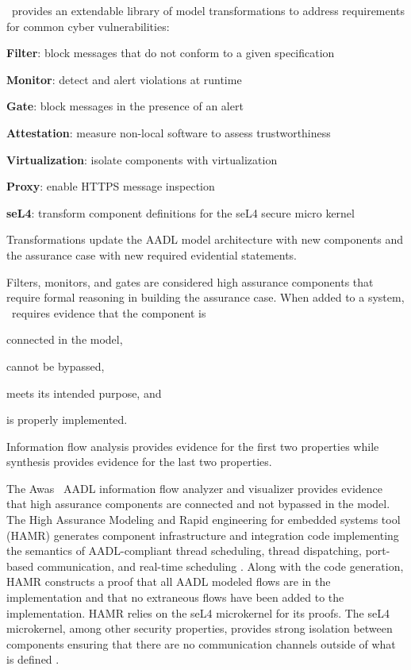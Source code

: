 \brfcs\ provides an extendable library of model transformations to address requirements for common cyber vulnerabilities:
\begin{compactitem}
	\item \textbf{Filter}: block messages that do not conform to a given specification
	\item \textbf{Monitor}: detect and alert violations at runtime
	\item \textbf{Gate}: block messages in the presence of an alert
	\item \textbf{Attestation}: measure non-local software to assess trustworthiness
	\item \textbf{Virtualization}: isolate components with virtualization
	\item \textbf{Proxy}: enable HTTPS message inspection 
	\item \textbf{seL4}: transform component definitions for the seL4 secure micro kernel
\end{compactitem}
Transformations update the AADL model architecture with new components and the assurance case with new required evidential statements.

Filters, monitors, and gates are considered high assurance components that require formal reasoning in building the assurance case.
When added to a system, \brfcs\ requires evidence that the component is 
\begin{compactenum}
	\item connected in the model, 
	\item cannot be bypassed, 
	\item meets its intended purpose, and
	\item is properly implemented.
\end{compactenum}
Information flow analysis provides evidence for the first two properties while synthesis provides evidence for the last two properties.

The Awas~\cite{awas} AADL information flow analyzer and visualizer provides evidence that high assurance components are connected and not bypassed in the model.
The High Assurance Modeling and Rapid engineering for embedded systems tool (HAMR) generates component infrastructure and integration code implementing the semantics of AADL-compliant thread scheduling, thread dispatching, port-based communication, and real-time scheduling \cite{hamr}.
Along with the code generation, HAMR constructs a proof that all AADL modeled flows are in the implementation and that no extraneous flows have been added to the implementation.
HAMR relies on the seL4 microkernel for its proofs.
The seL4 microkernel, among other security properties, provides strong isolation between components ensuring that there are no communication channels outside of what is defined \cite{sel4-sosp09, sel4-tocs14, sel4-cacm18}.

